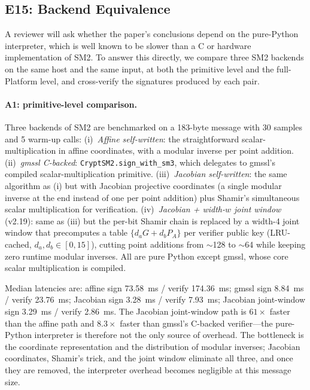 \documentclass[10pt,twocolumn]{IEEEtran}
\begin{document}
\subsection{E15: Backend Equivalence}

A reviewer will ask whether the paper's conclusions depend on the
pure-Python interpreter, which is well known to be slower than a C or
hardware implementation of SM2. To answer this directly, we compare
three SM2 backends on the same host and the same input, at both the
primitive level and the full-Platform level, and cross-verify the
signatures produced by each pair.

\paragraph{A1: primitive-level comparison.} Three backends of SM2 are
benchmarked on a 183-byte message with 30 samples and 5 warm-up
calls:
(i)~\emph{Affine self-written}: the straightforward scalar-multiplication
in affine coordinates, with a modular inverse per point addition.
(ii)~\emph{gmssl C-backed}: \texttt{CryptSM2.sign\_with\_sm3}, which
delegates to gmssl's compiled scalar-multiplication primitive.
(iii)~\emph{Jacobian self-written}: the same algorithm as (i) but
with Jacobian projective coordinates (a single modular inverse at
the end instead of one per point addition) plus Shamir's simultaneous
scalar multiplication for verification.
(iv)~\emph{Jacobian + width-$w$ joint window} (v2.19): same as (iii)
but the per-bit Shamir chain is replaced by a width-4 joint window
that precomputes a table $\{d_a G + d_b P_A\}$ per verifier public key
(LRU-cached, $d_a,d_b \in [0,15]$), cutting point additions from
$\sim$128 to $\sim$64 while keeping zero runtime modular inverses.
All are pure Python except gmssl, whose core scalar multiplication is
compiled.

Median latencies are: affine sign 73.58~ms / verify 174.36~ms;
gmssl sign 8.84~ms / verify 23.76~ms; Jacobian sign 3.28~ms /
verify 7.93~ms; Jacobian joint-window sign 3.29~ms / verify
2.86~ms. The Jacobian joint-window path is $61\times$ faster than
the affine path and $8.3\times$ faster than gmssl's C-backed
verifier---the pure-Python interpreter is
therefore not the only source of overhead. The bottleneck is the
coordinate representation and the distribution of modular inverses;
Jacobian coordinates, Shamir's trick, and the joint window eliminate
all three, and once they
are removed, the interpreter overhead becomes negligible at this
message size.
\end{document}
